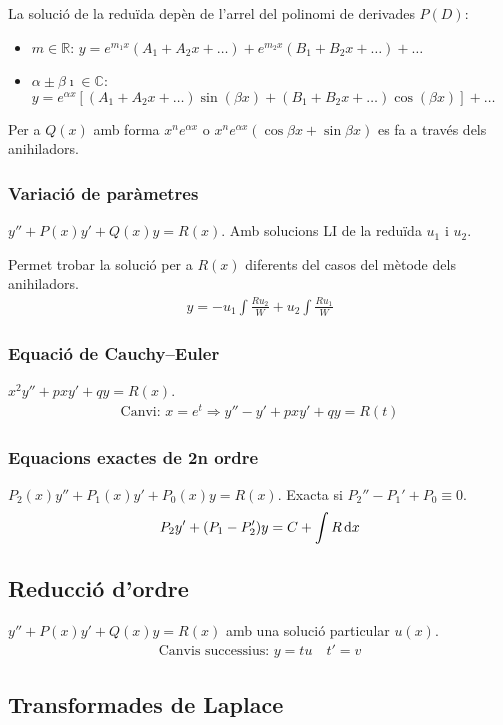 La solució de la reduïda depèn de l'arrel del polinomi de derivades $P(D)$:
\begin{itemize}
    \item $m \in \mathbb{R}$: $y = e^{m_{1}x} (A_{1} + A_{2} x + \dots ) + e^{m_{2}x} (B_{1} + B_{2} x + \dots) + \dots$
    \item $\alpha \pm \beta \imath \in \mathbb{C}$: $y = e^{\alpha x} [(A_{1} + A_{2} x + \dots ) \sin (\beta x) + (B_{1} + B_{2} x + \dots ) \cos (\beta x)] + \dots$
\end{itemize}
Per a $Q(x)$ amb forma $x^{n} e^{\alpha x}$ o $x^{n} e^{\alpha x} (\cos \beta x + \sin \beta x)$ es fa a través dels anihiladors.

\subsubsection*{Variació de paràmetres}
$\boxed{y'' + P(x) y' + Q(x) y = R(x)}$. Amb solucions LI de la reduïda $u_{1}$ i $u_{2}$.

Permet trobar la solució per a $R(x)$ diferents del casos del mètode dels anihiladors. 
\begin{align}
    y = -u_{1} \int \frac{R u_{2}}{W} + u_{2} \int \frac{R u_{1}}{W}
\end{align}

\subsubsection*{Equació de Cauchy--Euler}
$\boxed{x^{2} y'' + pxy' + qy =R(x)}$.
\begin{align}
    \text{Canvi: } x = e^{t} \Rightarrow y'' - y' + pxy' + qy = R(t)
\end{align}

\subsubsection*{Equacions exactes de 2n ordre}
$\boxed{P_{2}(x)y'' + P_{1}(x)y' + P_{0}(x)y = R(x)}$. Exacta si $P_{2}'' - P_{1}' + P_{0} \equiv 0$.
\begin{align}
    P_{2}y' + (P_{1} - P_{2}') y = C + \int R \mathop{}\!\mathrm{d} x
\end{align}

\subsection*{Reducció d'ordre}
$\boxed{y'' + P(x) y' + Q(x) y = R(x)}$ amb una solució particular $u(x)$.
\begin{align}
    \text{Canvis successius: } y = t u \quad t' = v
\end{align}

\newpage
\subsection*{Transformades de Laplace}